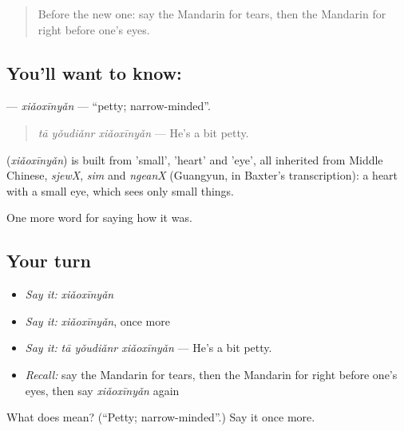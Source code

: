 \label{lesson:ZH-C471-xiaoxinyan}



\begin{quote}
Before the new one: say the Mandarin for tears, then the Mandarin for right before one's eyes.
\end{quote}

\subsection*{You'll want to know: }
\textbf{} — \emph{xiǎoxīnyǎn} — \textquotedblleft{}petty; narrow-minded\textquotedblright{}.

\begin{quote}
\textbf{} \emph{tā yǒudiǎnr xiǎoxīnyǎn} — He's a bit petty.
\end{quote}

\begin{cousinweb}
\textbf{} (\emph{xiǎoxīnyǎn}) is built from  'small',  'heart' and  'eye', all inherited from Middle Chinese, \emph{sjewX}, \emph{sim} and \emph{ngeanX} (Guangyun, in Baxter's transcription): a heart with a small eye, which sees only small things.
\end{cousinweb}

\begin{grammarlens}[title={What you've built}]
One more word for saying how it was.
\end{grammarlens}

\subsection*{Your turn}
\begin{itemize}
\raggedright
  \item \emph{Say it:} \emph{xiǎoxīnyǎn}
  \item \emph{Say it:} \emph{xiǎoxīnyǎn}, once more
  \item \emph{Say it:} \emph{tā yǒudiǎnr xiǎoxīnyǎn} — He's a bit petty.
  \item \emph{Recall:} say the Mandarin for tears, then the Mandarin for right before one's eyes, then say \emph{xiǎoxīnyǎn} again
\end{itemize}

\begin{tcolorbox}[breakable,colback=teal!4,colframe=teal!35!black,title={Before you move on}]
What does  mean? (\textquotedblleft{}Petty; narrow-minded\textquotedblright{}.) Say it once more.
\end{tcolorbox}
